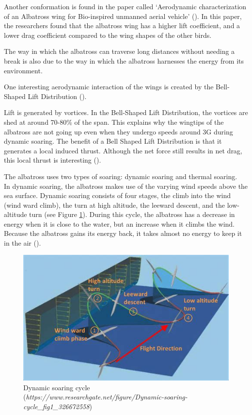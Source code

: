 Another conformation is found in the paper called ‘Aerodynamic characterization of an Albatross wing for Bio-inspired unmanned aerial vehicle’ (\cite{Bio_unmanned}). In this paper, the researchers found that the albatross wing has a higher lift coefficient, and a lower drag coefficient compared to the wing shapes of the other birds.

The way in which the albatross can traverse long distances without needing a break is also due to the way in which the albatross harnesses the energy from its environment.

One interesting aerodynamic interaction of the wings is created by the Bell-Shaped Lift Distribution (\cite{Evolution_Alba}).

Lift is generated by vortices. In the Bell-Shaped Lift Distribution, the vortices are shed at around 70-80\% of the span. This explains why the wingtips of the albatross are not going up even when they undergo speeds around 3G during dynamic soaring. The benefit of a Bell Shaped Lift Distribution is that it generates a local induced thrust. Although the net force still results in net drag, this local thrust is interesting (\cite{Evolution_Alba}). 

The albatross uses two types of soaring: dynamic soaring and thermal soaring.\\

In dynamic soaring, the albatross makes use of the varying wind speeds above the sea surface. Dynamic soaring consists of four stages, the climb into the wind (wind ward climb), the turn at high altitude, the leeward descent, and the low-altitude turn (see Figure \ref{fig:Dynamic soaring}). During this cycle, the albatross has a decrease in energy when it is close to the water, but an increase when it climbs the wind. Because the albatross gains its energy back, it takes almost no energy to keep it in the air (\cite{Evolution_Alba}). 

\begin{figure}
    \centering
    \includegraphics[width=0.5\linewidth]{images/dynamic soaring.jpeg}
    \caption{Dynamic soaring cycle (\textit{https://www.researchgate.net/figure/Dynamic-soaring-cycle_fig1_326672558})}
    \label{fig:Dynamic soaring}
\end{figure}

